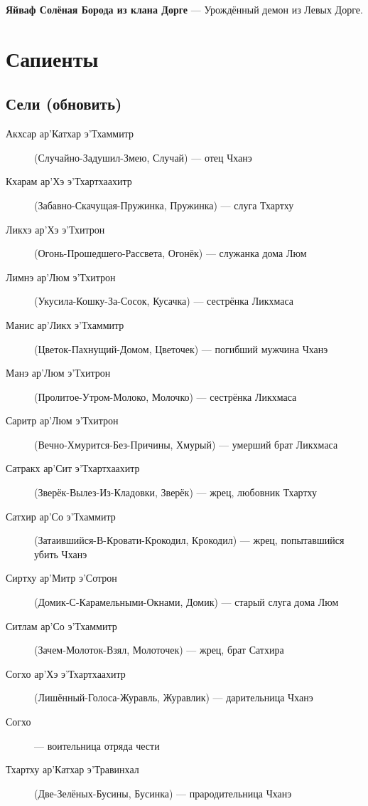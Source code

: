 \documentclass[a4paper,12pt,fleqn]{book}\usepackage{polyglossia}\setdefaultlanguage[babelshorthands=true]{russian}\setotherlanguage{english}\defaultfontfeatures{Ligatures=TeX,Mapping=tex-text}\usepackage{xcolor}\newcommand{\ml}[3]{#2}
\newcommand{\theterm}[3]{\textbf{\hypertarget{#1}{#2}} --- #3}
\begin{document}
{\theterm{jaivaf}
{Яйваф Солёная Борода из клана Дорге}
{Урождённый демон из Левых Дорге.}

\section{Сапиенты}

\subsection{Сели (обновить)}

\begin{description}

\item[Акхсар ар’Катхар э’Тхаммитр] (Случайно-Задушил-Змею, Случай) --- отец Чханэ

\item[Кхарам ар’Хэ э’Тхартхаахитр] (Забавно-Скачущая-Пружинка, Пружинка) --- слуга Тхартху

\item[Ликхэ ар’Хэ э’Тхитрон] (Огонь-Прошедшего-Рассвета, Огонёк) --- служанка дома Люм
\item[Лимнэ ар’Люм э’Тхитрон] (Укусила-Кошку-За-Сосок, Кусачка) --- сестрёнка Ликхмаса
\item[Манис ар’Ликх э’Тхаммитр] (Цветок-Пахнущий-Домом, Цветочек) --- погибший мужчина Чханэ

\item[Манэ ар’Люм э’Тхитрон] (Пролитое-Утром-Молоко, Молочко) --- сестрёнка Ликхмаса

\item[Саритр ар’Люм э’Тхитрон] (Вечно-Хмурится-Без-Причины, Хмурый) --- умерший брат Ликхмаса
\item[Сатракх ар’Сит э’Тхартхаахитр] (Зверёк-Вылез-Из-Кладовки, Зверёк) --- жрец, любовник Тхартху
\item[Сатхир ар’Со э’Тхаммитр] (Затаившийся-В-Кровати-Крокодил, Крокодил) --- жрец, попытавшийся убить Чханэ
\item[Сиртху ар’Митр э’Сотрон] (Домик-С-Карамельными-Окнами, Домик) --- старый слуга дома Люм
\item[Ситлам ар’Со э’Тхаммитр] (Зачем-Молоток-Взял, Молоточек) --- жрец, брат Сатхира

\item[Согхо ар’Хэ э’Тхартхаахитр] (Лишённый-Голоса-Журавль, Журавлик) --- дарительница Чханэ
\item[Согхо] --- воительница отряда чести


\item[Тхартху ар’Катхар э’Травинхал] (Две-Зелёных-Бусины, Бусинка) --- прародительница Чханэ



\end{description}}
\end{document}
